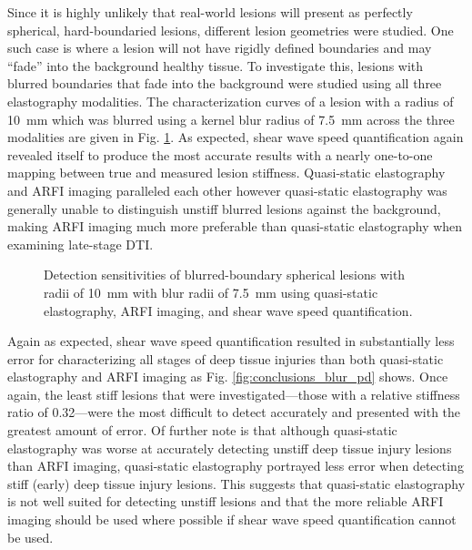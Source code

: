 			Since it is highly unlikely that real-world lesions will present as perfectly spherical, hard-boundaried lesions, different lesion geometries were studied. One such case is where a lesion will not have rigidly defined boundaries and may ``fade'' into the background healthy tissue. To investigate this, lesions with blurred boundaries that fade into the background were studied using all three elastography modalities. The characterization curves of a lesion with a radius of \SI{10}{\mm} which was blurred using a kernel blur radius of \SI{7.5}{\mm} across the three modalities are given in Fig. \ref{fig:conclusion_blur}. As expected, shear wave speed quantification again revealed itself to produce the most accurate results with a nearly one-to-one mapping between true and measured lesion stiffness. Quasi-static elastography and ARFI imaging paralleled each other however quasi-static elastography was generally unable to distinguish unstiff blurred lesions against the background, making ARFI imaging much more preferable than quasi-static elastography when examining late-stage DTI.

			\begin{figure}[!htb]
				\centering
				\caption[Detection sensitivities of blurred-boundary spherical lesions using the three investigated imaging modalities]{Detection sensitivities of blurred-boundary spherical lesions with radii of \SI{10}{\mm} with blur radii of \SI{7.5}{\mm} using quasi-static elastography, ARFI imaging, and shear wave speed quantification.}
				\label{fig:conclusion_blur}
			\end{figure}

			Again as expected, shear wave speed quantification resulted in substantially less error for characterizing all stages of deep tissue injuries than both quasi-static elastography and ARFI imaging as Fig. \ref{fig:conclusions_blur_pd} shows. Once again, the least stiff lesions that were investigated---those with a relative stiffness ratio of 0.32---were the most difficult to detect accurately and presented with the greatest amount of error. Of further note is that although quasi-static elastography was worse at accurately detecting unstiff deep tissue injury lesions than ARFI imaging, quasi-static elastography portrayed less error when detecting stiff (early) deep tissue injury lesions. This suggests that quasi-static elastography is not well suited for detecting unstiff lesions and that the more reliable ARFI imaging should be used where possible if shear wave speed quantification cannot be used.

